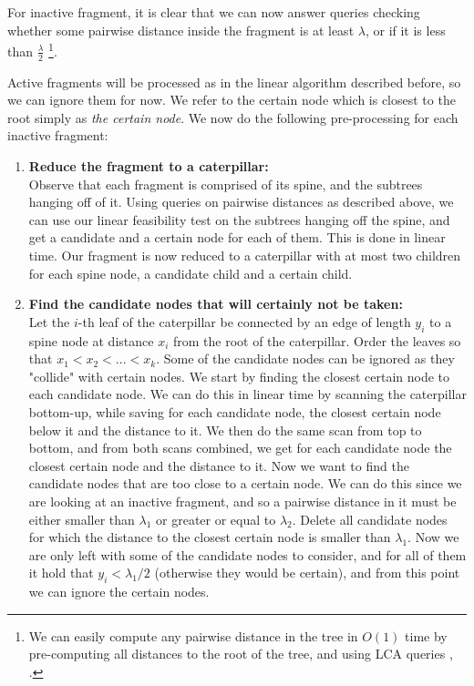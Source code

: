\documentclass[11pt,a4paper]{article}
\theoremstyle{definition}
\theoremstyle{remark}
\begin{document}
For inactive fragment, it is clear that we can now answer queries checking whether some pairwise distance inside the fragment is at least $\lambda$, or if it is less than $\frac{\lambda}{2}$ \footnote{We can easily compute any pairwise distance in the tree in $O(1)$ time by pre-computing all distances to the root of the tree, and using LCA queries \cite{Bender2000}, \cite{Djidjev1991}.}.

Active fragments will be processed as in the linear algorithm described before, so we can ignore them for now. We refer to the certain node which is closest to the root simply as \textit{the certain node}. We now do the following pre-processing for each inactive fragment:
\begin{enumerate}
\item\textbf{Reduce the fragment to a caterpillar:}\\
Observe that each fragment is comprised of its spine, and the subtrees hanging off of it. Using queries on pairwise distances as described above, we can use our linear feasibility test on the subtrees hanging off the spine, and get a candidate and a certain node for each of them. This is done in linear time.
Our fragment is now reduced to a caterpillar with at most two children for each spine node, a candidate child and a certain child.
\item\label{removing certain nodes}
\textbf{Find the candidate nodes that will certainly not be taken:}\\ %
Let the $i$-th leaf of the caterpillar be connected by an edge of length $y_i$ to a spine node at distance $x_i$ from the root of the caterpillar. Order the leaves so that $x_1 < x_2 < ... < x_k$.
Some of the candidate nodes can be ignored as they "collide" with certain nodes. We start by finding the closest certain node to each candidate node. We can do this in linear time by scanning the caterpillar bottom-up, while saving for each candidate node, the closest certain node below it and the distance to it. We then do the same scan from top to bottom, and from both scans combined, we get for each candidate node the closest certain node and the distance to it. Now we want to find the candidate nodes that are too close to a certain node. We can do this since we are looking at an inactive fragment, and so a pairwise distance in it must be either smaller than $\lambda_1$ or greater or equal to $\lambda_2$. Delete all candidate nodes for which the distance to the closest certain node is smaller than $\lambda_1$. 
Now we are only left with some of the candidate nodes to consider, and for all of them it hold that $y_i < \lambda_1/2$ (otherwise they would be certain), and from this point we can ignore the certain nodes.

\end{enumerate}
\end{document}
